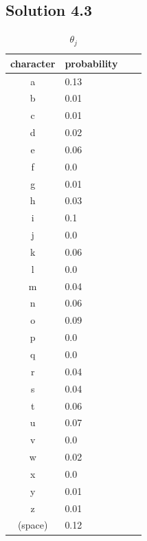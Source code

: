 \documentclass[a4paper]{article}
\theoremstyle{definition}
\newenvironment{soln}{
	\leavevmode\color{blue}\ignorespaces
}{}
\begin{document}
	\clearpage
	\subsection*{Solution 4.3}	
	\begin{soln}

\begin{table}[h]
  \begin{minipage}[t]{.45\textwidth}
    \begin{center}
        \caption{$\theta_j$}
      \begin{tabular}{clll}
   \hline
   character & probability \\
   \hline \hline

a & 0.13 \\
b & 0.01 \\
c & 0.01 \\
d & 0.02 \\
e & 0.06 \\
f & 0.0 \\
g & 0.01 \\
h & 0.03 \\
i & 0.1 \\
j & 0.0 \\
k & 0.06 \\
l & 0.0 \\
m & 0.04 \\
n & 0.06 \\
o & 0.09 \\
p & 0.0 \\
q & 0.0 \\
r & 0.04 \\
s & 0.04 \\
t & 0.06 \\
u & 0.07 \\
v & 0.0 \\
w & 0.02 \\
x & 0.0 \\
y & 0.01 \\
z & 0.01 \\
(space)  & 0.12 \\
   \hline
      \end{tabular}
    \end{center}


\end{minipage}
\end{table}
\end{soln}
\end{document}
